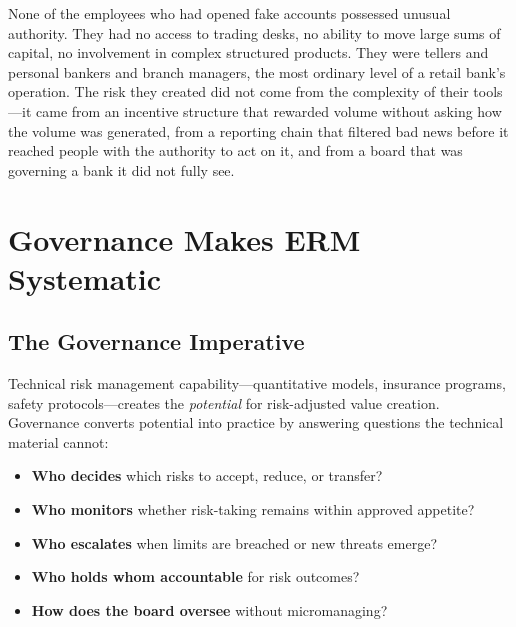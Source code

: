 \documentclass[11pt,openany]{book}
\providecommand{\tightlist}{\setlength{\itemsep}{0pt}\setlength{\parskip}{0pt}}
\begin{document}
\begin{corporateexample}
None of the employees who had opened fake accounts possessed unusual
authority. They had no access to trading desks, no ability to move large sums
of capital, no involvement in complex structured products. They were tellers
and personal bankers and branch managers, the most ordinary level of a retail
bank's operation. The risk they created did not come from the complexity of
their tools---it came from an incentive structure that rewarded volume
without asking how the volume was generated, from a reporting chain that
filtered bad news before it reached people with the authority to act on it,
and from a board that was governing a bank it did not fully see.

\end{corporateexample}

\section{Governance Makes ERM Systematic}
\label{sec:governance-imperative}

\subsection{The Governance Imperative}

Technical risk management capability---quantitative models, insurance
programs, safety protocols---creates the \emph{potential} for risk-adjusted
value creation. Governance converts potential into practice by answering
questions the technical material cannot:

\begin{itemize}\tightlist
  \item \textbf{Who decides} which risks to accept, reduce, or transfer?
  \item \textbf{Who monitors} whether risk-taking remains within approved
        appetite?
  \item \textbf{Who escalates} when limits are breached or new threats
        emerge?
  \item \textbf{Who holds whom accountable} for risk outcomes?
  \item \textbf{How does the board oversee} without micromanaging?
\end{itemize}
\end{document}
